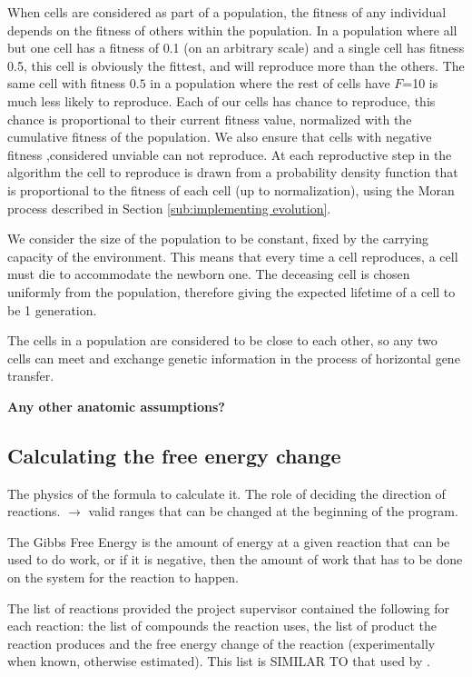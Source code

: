\documentclass[a4paper,12pt]{article}
\begin{document}
	When cells are considered as part of a population, the fitness of any individual depends on the fitness of others within the population. In a population where all but one cell has a fitness of 0.1 (on an arbitrary scale) and a single cell has fitness 0.5, this cell is obviously the fittest, and will reproduce more than the others. The same cell with fitness $0.5$ in a population where the rest of cells have $F$=10 is much less likely to reproduce. Each of our cells has chance to reproduce, this chance is proportional to their current fitness value, normalized with the cumulative fitness of the population. We also ensure that cells with negative fitness ,considered unviable can not reproduce. At each reproductive step in the algorithm the cell to reproduce is drawn from a probability density function that is proportional to the fitness of each cell (up to normalization), using the Moran process described in Section \ref{sub:implementing evolution}.


	We consider the size of the population to be constant, fixed by the carrying capacity of the environment. This means that every time a cell reproduces, a cell must die to accommodate the newborn one. The deceasing cell is chosen uniformly from the population, therefore giving the expected lifetime of a cell to be 1 generation.

	The cells in a population are considered to be close to each other, so  any two cells can meet and exchange genetic information in the process of horizontal gene transfer.

	\textbf{Any other anatomic assumptions?}

\subsection{Calculating the free energy change}
\label{sub:The free energy change}
The physics of the formula to calculate it. The role of deciding the direction of reactions.  $\rightarrow$ valid ranges  that can be changed at the beginning of the program.

	The Gibbs Free Energy is the amount of energy at a given reaction that can be used to do work, or if it is negative, then the amount of work that has to be done on the system for the reaction to happen. 


	The list of reactions provided the project supervisor contained the following for each reaction: the list of compounds the reaction uses, the list of product the reaction produces and the free energy change of the reaction (experimentally when known, otherwise estimated). This list is SIMILAR TO that used by \cite{BartekLower}.
	
\end{document}
